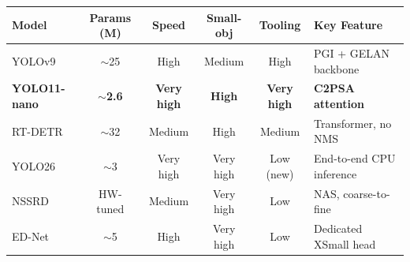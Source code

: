 \documentclass[border=10pt]{standalone}
\begin{document}
\begin{tabular}{lccccl}
\toprule
\textbf{Model} & \textbf{Params (M)} & \textbf{Speed} & \textbf{Small-obj} & \textbf{Tooling} & \textbf{Key Feature} \\
\midrule
YOLOv9              & $\sim$25         & High      & Medium    & High        & PGI + GELAN backbone \\
\textbf{YOLO11-nano}& \textbf{$\sim$2.6}& \textbf{Very high} & \textbf{High} & \textbf{Very high} & \textbf{C2PSA attention} \\
RT-DETR             & $\sim$32         & Medium    & High      & Medium      & Transformer, no NMS \\
YOLO26              & $\sim$3          & Very high & Very high & Low (new)   & End-to-end CPU inference \\
NSSRD               & HW-tuned         & Medium    & Very high & Low         & NAS, coarse-to-fine \\
ED-Net              & $\sim$5          & High      & Very high & Low         & Dedicated XSmall head \\
\bottomrule
\end{tabular}
\end{document}
